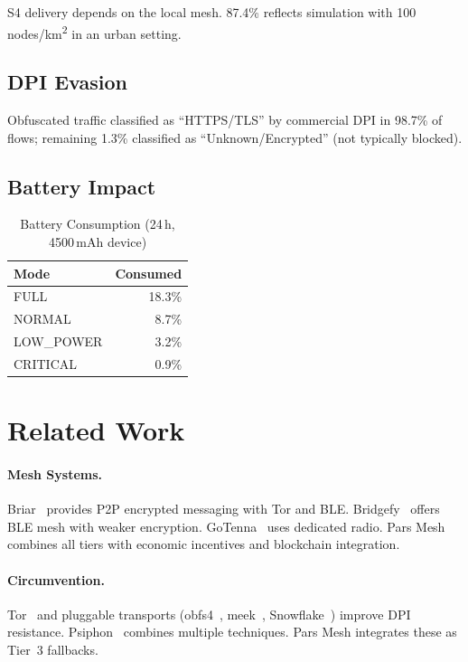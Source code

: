 \documentclass[11pt,a4paper]{article}
\begin{document}
S4 delivery depends on the local mesh.  87.4\% reflects simulation with 100
nodes/km\textsuperscript{2} in an urban setting.

\subsection{DPI Evasion}

Obfuscated traffic classified as ``HTTPS/TLS'' by commercial DPI in 98.7\%
of flows; remaining 1.3\% classified as ``Unknown/Encrypted'' (not
typically blocked).

\subsection{Battery Impact}

\begin{table}[h]
\centering
\caption{Battery Consumption (24\,h, 4500\,mAh device)}
\label{tab:battery-result}
\begin{tabular}{@{}lr@{}}
\toprule
\textbf{Mode}    & \textbf{Consumed} \\
\midrule
FULL             & 18.3\% \\
NORMAL           &  8.7\% \\
LOW\_POWER       &  3.2\% \\
CRITICAL         &  0.9\% \\
\bottomrule
\end{tabular}
\end{table}

\section{Related Work}
\label{sec:related}

\paragraph{Mesh Systems.}
Briar~\cite{briar2017} provides P2P encrypted messaging with Tor and BLE.
Bridgefy~\cite{bridgefy2019} offers BLE mesh with weaker encryption.
GoTenna~\cite{gotenna2018} uses dedicated radio.  Pars Mesh combines all
tiers with economic incentives and blockchain integration.

\paragraph{Circumvention.}
Tor~\cite{dingledine2004tor} and pluggable transports
(obfs4~\cite{angel2014obfs4}, meek~\cite{fifield2015meek},
Snowflake~\cite{fifield2017snowflake}) improve DPI resistance.
Psiphon~\cite{psiphon2020} combines multiple techniques.  Pars Mesh
integrates these as Tier~3 fallbacks.
\end{document}
